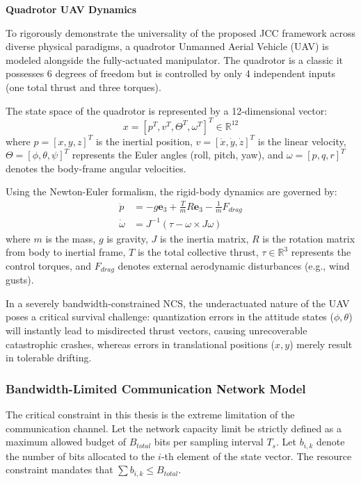 \noindent\textbf{Quadrotor UAV Dynamics}

To rigorously demonstrate the universality of the proposed JCC framework across diverse physical paradigms, a quadrotor Unmanned 
Aerial Vehicle (UAV) is modeled alongside the fully-actuated manipulator. The quadrotor is a classic it possesses 6 degrees of freedom but is controlled by only 4 independent inputs (one total thrust and three torques).

The state space of the quadrotor is represented by a 12-dimensional vector:
\begin{equation}
    x = [p^T, v^T, \Theta^T, \omega^T]^T \in \mathbb{R}^{12}
\end{equation}
where $p=[x,y,z]^T$ is the inertial position, $v=[\dot{x}, \dot{y}, \dot{z}]^T$ is the linear velocity, $\Theta = [\phi, \theta, \psi]^T$ represents the Euler angles (roll, pitch, yaw), and $\omega = [p, q, r]^T$ denotes the body-frame angular velocities.

Using the Newton-Euler formalism, the rigid-body dynamics are governed by:
\begin{align}
    \ddot{p} &= -g \mathbf{e}_3 + \frac{T}{m} R \mathbf{e}_3 - \frac{1}{m} F_{drag} \\
    \dot{\omega} &= J^{-1} (\tau - \omega \times J \omega)
\end{align}
where $m$ is the mass, $g$ is gravity, $J$ is the inertia matrix, $R$ is the rotation matrix from body to inertial frame, $T$ is the total collective thrust,
$\tau \in \mathbb{R}^3$ represents the control torques, and $F_{drag}$ denotes external aerodynamic disturbances (e.g., wind gusts).

In a severely bandwidth-constrained NCS, the underactuated nature of the UAV poses a critical survival challenge: 
quantization errors in the attitude states ($\phi, \theta$) will instantly lead to misdirected thrust vectors, causing unrecoverable catastrophic crashes, 
whereas errors in translational positions ($x, y$) merely result in tolerable drifting.
\subsubsection{Bandwidth-Limited Communication Network Model}
The critical constraint in this thesis is the extreme limitation of the communication channel. 
Let the network capacity limit be strictly defined as a maximum allowed budget of $B_{total}$ bits per sampling interval $T_s$. 
Let $b_{i,k}$ denote the number of bits allocated to the $i$-th element of the state vector. The resource constraint mandates that $\sum b_{i,k} \le B_{total}$.

